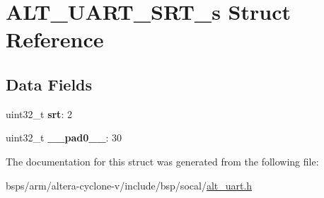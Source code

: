 \hypertarget{structALT__UART__SRT__s}{}\section{A\+L\+T\+\_\+\+U\+A\+R\+T\+\_\+\+S\+R\+T\+\_\+s Struct Reference}
\label{structALT__UART__SRT__s}
\subsection*{Data Fields}
\begin{DoxyCompactItemize}
\item 
\mbox{\label{structALT__UART__SRT__s_a7f5db73bfe1c76e1d233f880fa6e9f2b}} 
uint32\+\_\+t {\bfseries srt}\+: 2
\item 
\mbox{\label{structALT__UART__SRT__s_a8f4e4228bf12eb548b4d63dc490abb19}} 
uint32\+\_\+t {\bfseries \+\_\+\+\_\+pad0\+\_\+\+\_\+}\+: 30
\end{DoxyCompactItemize}


The documentation for this struct was generated from the following file\+:\begin{DoxyCompactItemize}
\item 
bsps/arm/altera-\/cyclone-\/v/include/bsp/socal/\mbox{\hyperlink{alt__uart_8h}{alt\+\_\+uart.\+h}}\end{DoxyCompactItemize}
